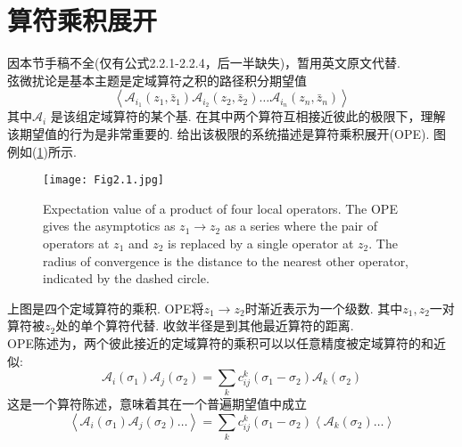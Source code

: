 \section{算符乘积展开}%
因本节手稿不全(仅有公式2.2.1-2.2.4，后一半缺失)，暂用英文原文代替.\\
弦微扰论是基本主题是定域算符之积的路径积分期望值
\begin{equation}
\left\langle\mathscr{A}_{i_{1}}\left(z_{1}, \bar{z}_{1}\right) \mathscr{A}_{i_{2}}\left(z_{2}, \bar{z}_{2}\right) \ldots \mathscr{A}_{i_{n}}\left(z_{n}, \bar{z}_{n}\right)\right\rangle
\end{equation}
其中$\mathscr{A}_{i}$ 是该组定域算符的某个基. 在其中两个算符互相接近彼此的极限下，理解该期望值的行为是非常重要的. 给出该极限的系统描述是算符乘积展开(OPE). 图例如(\ref{Fig2.1})所示.
\begin{figure}
	\begin{center}
		\texttt{[image: Fig2.1.jpg]}\\
\caption{Expectation value of a product of four local operators. The OPE gives the asymptotics as $z_1 \to z_2$ as a series where the pair of operators at $z_1 $ and $ z_2$ is replaced by a single operator at $z_2$. The radius of convergence is the distance to	the nearest other operator, indicated by the dashed circle.}\label{Fig2.1}
	\end{center}
\end{figure}
上图是四个定域算符的乘积. OPE将$z_1 \to z_2$时渐近表示为一个级数. 其中$z_1 , z_2$一对算符被$z_2$处的单个算符代替. 收敛半径是到其他最近算符的距离.\\
OPE陈述为，两个彼此接近的定域算符的乘积可以以任意精度被定域算符的和近似:
\begin{equation}
\mathscr{A}_{i}\left(\sigma_{1}\right) \mathscr{A}_{j}\left(\sigma_{2}\right)=\sum_{k} c_{i j}^{k}\left(\sigma_{1}-\sigma_{2}\right) \mathscr{A}_{k}\left(\sigma_{2}\right)
\end{equation}
这是一个算符陈述，意味着其在一个普遍期望值中成立
\begin{equation}
\left\langle\mathscr{A}_{i}\left(\sigma_{1}\right) \mathscr{A}_{j}\left(\sigma_{2}\right) \ldots\right\rangle=\sum_{k} c_{i j}^{k}\left(\sigma_{1}-\sigma_{2}\right)\left\langle\mathscr{A}_{k}\left(\sigma_{2}\right) \ldots\right\rangle
\end{equation}
